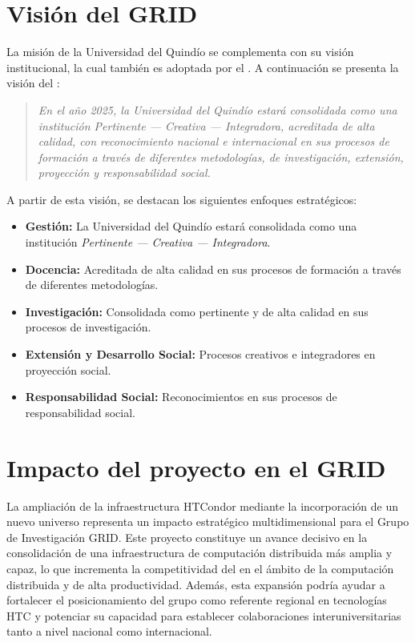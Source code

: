 \section{Visión del GRID}
La misión de la Universidad del Quindío se complementa con su visión institucional, la cual también es adoptada por el \GRID. A continuación se presenta la visión del \GRID:\@

\begin{quote}
	\textit{En el año 2025, la Universidad del Quindío estará consolidada como una institución \textit{Pertinente --- Creativa --- Integradora}, acreditada de alta calidad, con reconocimiento nacional e internacional en sus procesos de formación a través de diferentes metodologías, de investigación, extensión, proyección y responsabilidad social.}
\end{quote}

A partir de esta visión, se destacan los siguientes enfoques estratégicos:

\begin{itemize}
	\item \textbf{Gestión:} La Universidad del Quindío estará consolidada como una institución \textit{Pertinente --- Creativa --- Integradora}.

	\item \textbf{Docencia:} Acreditada de alta calidad en sus procesos de formación a través de diferentes metodologías.

	\item \textbf{Investigación:} Consolidada como pertinente y de alta calidad en sus procesos de investigación.

	\item \textbf{Extensión y Desarrollo Social:} Procesos creativos e integradores en proyección social.

	\item \textbf{Responsabilidad Social:} Reconocimientos en sus procesos de responsabilidad social.
\end{itemize}

\section{Impacto del proyecto en el GRID}
La ampliación de la infraestructura HTCondor mediante la incorporación de un nuevo universo representa un impacto estratégico multidimensional para el Grupo de Investigación GRID. Este proyecto constituye un avance decisivo en la consolidación de una infraestructura de computación distribuida más amplia y capaz, lo que incrementa la competitividad del \GRID en el ámbito de la computación distribuida y de alta productividad. Además, esta expansión podría ayudar a fortalecer el posicionamiento del grupo como referente regional en tecnologías HTC y potenciar su capacidad para establecer colaboraciones interuniversitarias tanto a nivel nacional como internacional.


